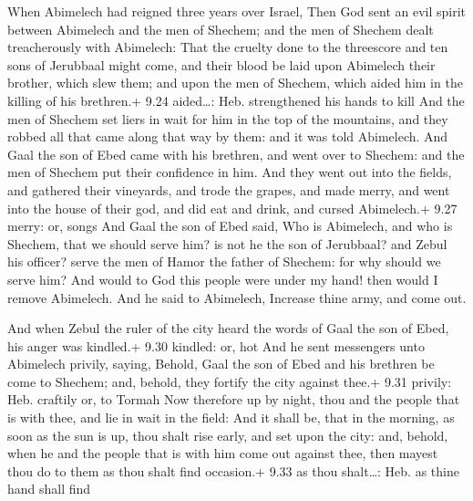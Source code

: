  When Abimelech had reigned three years over Israel,
 Then God sent an evil spirit between Abimelech and the men
of Shechem; and the men of Shechem dealt treacherously with Abimelech:
 That the cruelty done to the threescore and ten sons of
Jerubbaal might come, and their blood be laid upon Abimelech their
brother, which slew them; and upon the men of Shechem, which aided him
in the killing of his brethren.+ 9.24 aided\ldots: Heb. strengthened his
hands to kill  And the men of Shechem set liers in wait for
him in the top of the mountains, and they robbed all that came along
that way by them: and it was told Abimelech.  And Gaal the
son of Ebed came with his brethren, and went over to Shechem: and the
men of Shechem put their confidence in him.  And they went
out into the fields, and gathered their vineyards, and trode the grapes,
and made merry, and went into the house of their god, and did eat and
drink, and cursed Abimelech.+ 9.27 merry: or, songs  And
Gaal the son of Ebed said, Who is Abimelech, and who is Shechem, that we
should serve him? is not he the son of Jerubbaal? and Zebul his officer?
serve the men of Hamor the father of Shechem: for why should we serve
him?  And would to God this people were under my hand! then
would I remove Abimelech. And he said to Abimelech, Increase thine army,
and come out.

 And when Zebul the ruler of the city heard the words of
Gaal the son of Ebed, his anger was kindled.+ 9.30 kindled: or, hot
 And he sent messengers unto Abimelech privily, saying,
Behold, Gaal the son of Ebed and his brethren be come to Shechem; and,
behold, they fortify the city against thee.+ 9.31 privily: Heb. craftily
or, to Tormah  Now therefore up by night, thou and the
people that is with thee, and lie in wait in the field: 
And it shall be, that in the morning, as soon as the sun is up, thou
shalt rise early, and set upon the city: and, behold, when he and the
people that is with him come out against thee, then mayest thou do to
them as thou shalt find occasion.+ 9.33 as thou shalt\ldots: Heb. as
thine hand shall find

